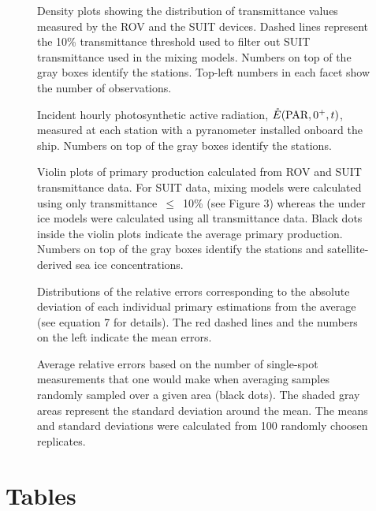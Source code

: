 \documentclass[draft]{agujournal2018}
\begin{document}
\begin{figure}[h]
	\centering
	\caption{Density plots showing the distribution of transmittance values measured by the ROV and the SUIT devices. Dashed lines represent the 10\% transmittance threshold used to filter out SUIT transmittance used in the mixing models. Numbers on top of the gray boxes identify the stations. Top-left numbers in each facet show the number of observations.}
\end{figure}

\begin{figure}[h]
	\centering
	\caption{Incident hourly photosynthetic active radiation, $\mathring{E}(\textnormal{PAR}, 0^+, t)$, measured at each station with a pyranometer installed onboard the ship. Numbers on top of the gray boxes identify the stations.}
\end{figure}

\begin{figure}[h]
	\centering
	\caption{Violin plots of primary production calculated from ROV and SUIT transmittance data. For SUIT data, mixing models were calculated using only transmittance~$\le$~10\% (see Figure 3) whereas the under ice models were calculated using all transmittance data. Black dots inside the violin plots indicate the average primary production. Numbers on top of the gray boxes identify the stations and satellite-derived sea ice concentrations.}
\end{figure}

\begin{figure}[h]
	\centering
	\caption{Distributions of the relative errors corresponding to the absolute deviation of each individual primary estimations from the average (see equation 7 for details). The red dashed lines and the numbers on the left indicate the mean errors.}
\end{figure}

\begin{figure}[h]
	\centering
	\caption{Average relative errors based on the number of single-spot measurements that one would make when averaging samples randomly sampled over a given area (black dots). The shaded gray areas represent the standard deviation around the mean. The means and standard deviations were calculated from 100 randomly choosen replicates.}
\end{figure}

\clearpage
\newpage

\section{Tables}
\end{document}
